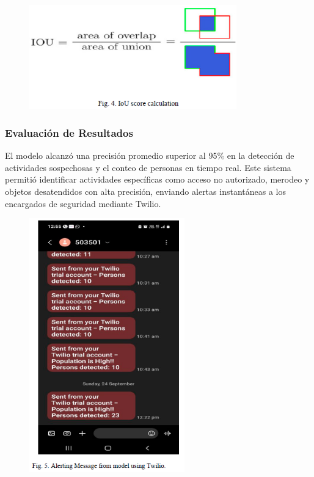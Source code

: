 \documentclass[listof=nochaptergap,12pt,times,authoryear]{report}
\begin{document}
\begin{figure}[h] %
    \centering
    \includegraphics[width=0.8\textwidth]{tab1.4.png} %
    \label{fig:ejemplo} %
\end{figure}

\clearpage

\subsubsection{Evaluación de Resultados}
El modelo alcanzó una precisión promedio superior al 95\% en la detección de actividades sospechosas y el conteo de personas en tiempo real. Este sistema permitió identificar actividades específicas como acceso no autorizado, merodeo y objetos desatendidos con alta precisión, enviando alertas instantáneas a los encargados de seguridad mediante Twilio.

\begin{figure}[h] %
    \centering
    \includegraphics[width=0.6\textwidth]{re1.png} %
    \label{fig:ejemplo} %
\end{figure}
\end{document}
